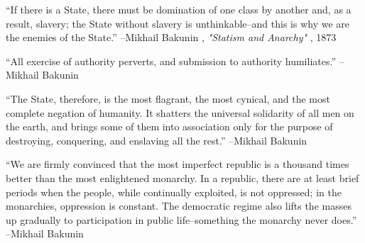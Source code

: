 \documentclass{article}%
\begin{document}
\linebreak%
\vspace{1mm}%
\begin{minipage}{\textwidth}%
\flushleft%
“If there is a State, there must be domination of one class by another and, as a result, slavery; the State without slavery is unthinkable–and this is why we are the enemies of the State.”%
\linebreak%
\vspace{1mm}%
–Mikhail Bakunin%
, \textit{"Statism and Anarchy"}%
, 1873%
\linebreak%
\vspace{1mm}%
\end{minipage}%
\linebreak%
\vspace{1mm}%
\begin{minipage}{\textwidth}%
\flushleft%
“All exercise of authority perverts, and submission to authority humiliates.”%
\linebreak%
\vspace{1mm}%
–Mikhail Bakunin%
\linebreak%
\vspace{1mm}%
\end{minipage}%
\linebreak%
\vspace{1mm}%
\begin{minipage}{\textwidth}%
\flushleft%
“The State, therefore, is the most flagrant, the most cynical, and the most complete negation of humanity. It shatters the universal solidarity of all men on the earth, and brings some of them into association only for the purpose of destroying, conquering, and enslaving all the rest.”%
\linebreak%
\vspace{1mm}%
–Mikhail Bakunin%
\linebreak%
\vspace{1mm}%
\end{minipage}%
\linebreak%
\vspace{1mm}%
\begin{minipage}{\textwidth}%
\flushleft%
“We are firmly convinced that the most imperfect republic is a thousand times better than the most enlightened monarchy. In a republic, there are at least brief periods when the people, while continually exploited, is not oppressed; in the monarchies, oppression is constant. The democratic regime also lifts the masses up gradually to participation in public life–something the monarchy never does.”%
\linebreak%
\vspace{1mm}%
–Mikhail Bakunin%
\linebreak%
\vspace{1mm}%
\end{minipage}%
\end{document}
